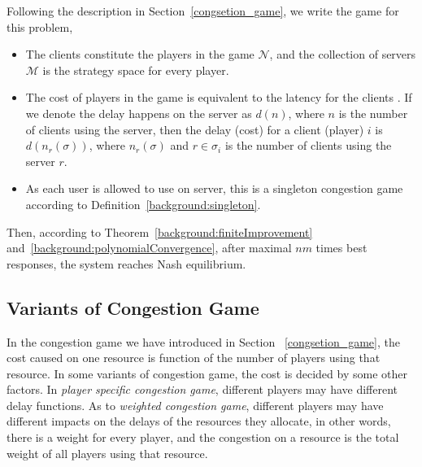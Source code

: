 Following the description in Section~\ref{congsetion_game}, we write the game for this problem, 
\begin{itemize}
\item The clients constitute the players in the game $\mathcal{N}$, and the collection of servers $\mathcal{M}$ is the strategy space for every player.
\item The cost of players in the game is equivalent to the latency for the clients .
If we denote the delay happens on the server as $d(n)$, where $n$ is the number of clients using the server, then the delay (cost) for a client (player) $i$ is $d(n_r(\sigma))$, where $n_r(\sigma)$ and $r\in \sigma_i$ is the number of clients using the server $r$.
\item As each user is allowed to use on server, this is a singleton congestion game according to Definition~\ref{background:singleton}.
\end{itemize}

Then, according to Theorem~\ref{background:finiteImprovement} and~\ref{background:polynomialConvergence}, after maximal $nm$ times best responses, the system reaches Nash equilibrium.








\subsection{Variants of Congestion Game}
In the congestion game we have introduced in Section ~\ref{congsetion_game}, the cost caused on one resource is function of the number of players using that resource.
In some variants of congestion game, the cost is decided by some other factors.
In \textit{player specific congestion game}, different players may have different delay functions.
As to \textit{weighted congestion game}, different players may have different impacts on the delays of the resources they allocate, in other words, there is a weight for every player, and the congestion on a resource is the total weight of all players using that resource.

